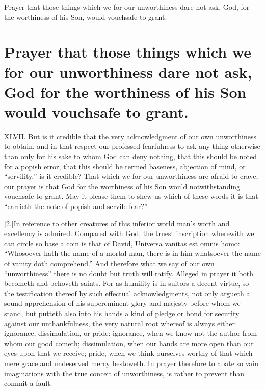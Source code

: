 Prayer that those things which we for our unworthiness dare not ask, God, for the worthiness of his Son, would vouchsafe to grant.
\section*{Prayer that those things which we for our unworthiness dare not ask, God for the worthiness of his Son would vouchsafe to grant.}
XLVII. But is it credible that the very acknowledgment of our own unworthiness to obtain, and in that respect our professed fearfulness to ask any thing otherwise than only for his sake to whom God can deny nothing, that this should be noted for a popish error, that this should be termed baseness, abjection of mind, or “servility,” is it credible? That which we for our unworthiness are afraid to crave, our prayer is that God for the worthiness of his Son would notwithstanding vouchsafe to grant. May it please them to shew us which of these words it is that “carrieth the note of popish and servile fear?”

[2.]In reference to other creatures of this inferior world man’s worth and excellency is admired. Compared with God, the truest inscription wherewith we can circle so base a coin is that of David, Universa vanitas est omnis homo: “Whosoever  hath the name of a mortal man, there is in him whatsoever the name of vanity doth comprehend.”
 And therefore what we say of our own “unworthiness” there is no doubt but truth will ratify. Alleged in prayer it both becometh and behoveth saints. For as humility is in suitors a decent virtue, so the testification thereof by such effectual acknowledgments, not only argueth a sound apprehension of his supereminent glory and majesty before whom we stand, but putteth also into his hands a kind of pledge or bond for security against our unthankfulness, the very natural root whereof is always either ignorance, dissimulation, or pride: ignorance, when we know not the author from whom our good cometh; dissimulation, when our hands are more open than our eyes upon that we receive; pride, when we think ourselves worthy of that which mere grace and undeserved mercy bestoweth. In prayer therefore to abate so vain imaginations with the true conceit of unworthiness, is rather to prevent than commit a fault.

